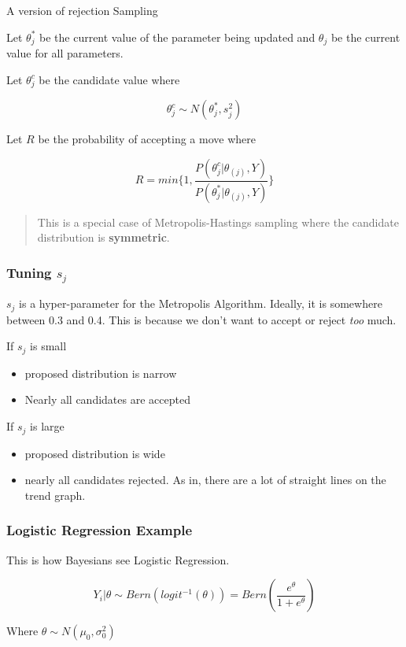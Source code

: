 \documentclass[11pt]{article}
\begin{document}
A version of rejection Sampling

Let \(\theta_j^*\) be the current value of the parameter being updated and
\(\theta_j\) be the current value for all parameters.

Let \(\theta_j^c\) be the candidate value where

$$
\theta_j^c \sim N(\theta_j^*, s_j^2)
$$


Let \(R\) be the probability of accepting a move where

$$
R = min \{ 1, \frac{P(\theta_j^c | \theta_{(j)}, Y)}{P(\theta_j^* |
\theta_{(j)}, Y)} \}
$$

\begin{quote}
This is a special case of Metropolis-Hastings sampling where the candidate
distribution is \textbf{symmetric}.
\end{quote}

\subsubsection{Tuning \(s_j\)}
\label{sec:org86dd9e5}

\(s_j\) is a hyper-parameter for the Metropolis Algorithm. Ideally, it is
somewhere between 0.3 and 0.4. This is because we don't want to accept or reject
\emph{too} much.

If \(s_j\) is small
\begin{itemize}
\item proposed distribution is narrow
\item Nearly all candidates are accepted
\end{itemize}

If \(s_j\) is large
\begin{itemize}
\item proposed distribution is wide
\item nearly all candidates rejected. As in, there are a lot of straight lines on
the trend graph.
\end{itemize}

\subsubsection{Logistic Regression Example}
\label{sec:org13c6eb5}

This is how Bayesians see Logistic Regression.

$$
Y_i | \theta \sim Bern(logit^{-1}(\theta)) = Bern(\frac{e^\theta}{1 + e^\theta})
$$

Where \(\theta \sim N(\mu_0, \sigma_0^2)\)
\end{document}
